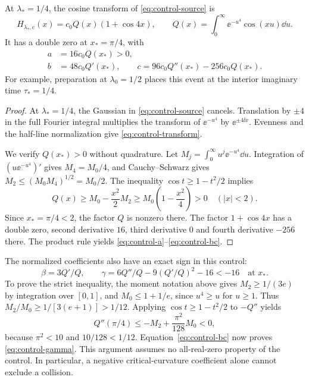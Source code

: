 \begin{proposition}\label{prop:control}
At \(\lambda_*=1/4\), the cosine transform of
\eqref{eq:control-source} is
\begin{equation}\label{eq:control-transform}
 H_{\lambda_*,\mathrm c}(x)=c_0 Q(x)(1+\cos4x),\qquad
 Q(x)=\int_0^\infty\ee^{-u^4}\cos(xu)\dd u.
\end{equation}
It has a double zero at \(x_*=\pi/4\), with
\begin{align}
 a&=16c_0Q(x_*)>0,\label{eq:control-a}\\
 b&=48c_0Q'(x_*),\qquad
 c=96c_0Q''(x_*)-256c_0Q(x_*).\label{eq:control-bc}
\end{align}
For example, preparation at \(\lambda_0=1/2\) places this event
at the interior imaginary time \(\tau_*=1/4\).
\end{proposition}
\begin{proof}
At \(\lambda_*=1/4\), the Gaussian in \eqref{eq:control-source}
cancels. Translation by \(\pm4\) in the full Fourier integral
multiplies the transform of \(\ee^{-u^4}\) by
\(\ee^{\pm4\ii x}\). Evenness and the half-line normalization give
\eqref{eq:control-transform}.

We verify \(Q(x_*)>0\) without quadrature. Let
\(M_j=\int_0^\infty u^j\ee^{-u^4}\dd u\).
Integration of \((u\ee^{-u^4})'\) gives \(M_4=M_0/4\), and
Cauchy--Schwarz gives \(M_2\leq(M_0M_4)^{1/2}=M_0/2\).
The inequality \(\cos t\geq1-t^2/2\) implies
\[
 Q(x)\geq M_0-\frac{x^2}{2}M_2
       \geq M_0\left(1-\frac{x^2}{4}\right)>0
       \quad (|x|<2).
\]
Since \(x_*=\pi/4<2\), the factor \(Q\) is nonzero there.
The factor \(1+\cos4x\) has a double zero, second derivative \(16\),
third derivative \(0\) and fourth derivative \(-256\) there.
The product rule yields \eqref{eq:control-a}--\eqref{eq:control-bc}.
\end{proof}

The normalized coefficients also have an exact sign in this control:
\begin{equation}\label{eq:control-gamma}
 \beta=3Q'/Q,\qquad
 \gamma=6Q''/Q-9(Q'/Q)^2-16<-16
 \quad\text{at }x_*.
\end{equation}
To prove the strict inequality, the moment notation above gives
\(M_2\ge1/(3e)\) by integration over \([0,1]\), and
\(M_0\le1+1/e\), since \(u^4\ge u\) for \(u\ge1\).
Thus \(M_2/M_0\ge1/[3(e+1)]>1/12\). Applying
\(\cos t\ge1-t^2/2\) to \(-Q''\) yields
\[
 Q''(\pi/4)\le-M_2+\frac{\pi^2}{128}M_0<0,
\]
because \(\pi^2<10\) and \(10/128<1/12\).
Equation~\eqref{eq:control-bc} now proves \eqref{eq:control-gamma}.
This argument assumes no all-real-zero property of the control.
In particular, a negative critical-curvature coefficient alone
cannot exclude a collision.

